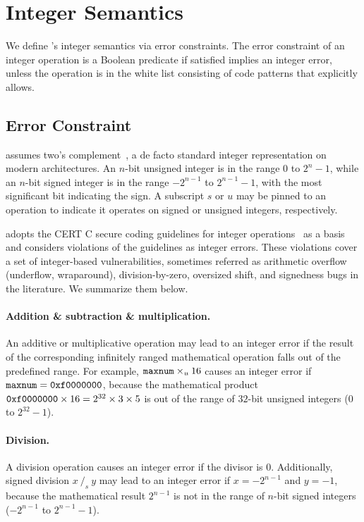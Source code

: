 \section{Integer Semantics}
\label{s:sema}

We define \sys's integer semantics via error constraints.  The error
constraint of an integer operation is a Boolean predicate if satisfied
implies an integer error, unless the operation is in the white list
consisting of code patterns that \sys explicitly allows.

\subsection{Error Constraint}
\label{s:sema:constr}

\sys assumes two's complement~\cite[\chapterautorefname~4.2.1]{intel:vol1},
a de facto standard integer representation on modern architectures.
An $n$-bit unsigned integer is in the range $0$ to $2^n-1$, while
an $n$-bit signed integer is in the range $-2^{n-1}$ to $2^{n-1}-1$,
with the most significant bit indicating the sign.  A subscript $s$
or $u$ may be pinned to an operation to indicate it operates on
signed or unsigned integers, respectively.

\sys adopts the CERT C secure coding guidelines for integer
operations~\cite[\chapterautorefname~5]{seacord:secure-c} as a basis
and considers violations of the guidelines as integer errors.  These
violations cover a set of integer-based vulnerabilities, sometimes
referred as arithmetic overflow (underflow, wraparound), division-by-zero,
oversized shift, and signedness bugs in the literature.  We summarize
them below.
\fi

\paragraph{Addition \& subtraction \& multiplication.}
An additive or multiplicative operation may lead to an integer error
if the result of the corresponding infinitely ranged mathematical
operation falls out of the predefined range.  For example,
$\texttt{maxnum}\times_u 16$ causes an integer error if $\texttt{maxnum} =
\texttt{0xf0000000}$, because the mathematical product $\texttt{0xf0000000}
\times 16 = 2^{32}\times 3\times 5$ is out of the range of $32$-bit
unsigned integers ($0$ to $2^{32} - 1$).

\paragraph{Division.}
A division operation causes an integer error if the divisor is 0.
Additionally, signed division $x\ /_s\ y$ may lead to an integer
error if $x = -2^{n-1}$ and $y = -1$, because the mathematical
result $2^{n-1}$ is not in the range of $n$-bit signed integers
($-2^{n-1}$ to $2^{n-1}-1$).

